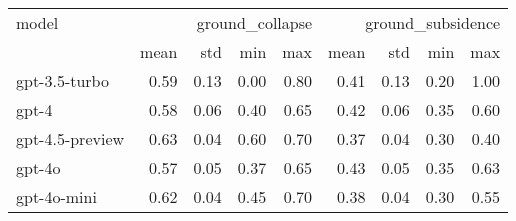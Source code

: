 \begin{tabular}{lrrrrrrrr}
\toprule
model & \multicolumn{4}{r}{ground_collapse} & \multicolumn{4}{r}{ground_subsidence} \\
 & mean & std & min & max & mean & std & min & max \\
\midrule
gpt-3.5-turbo & 0.59 & 0.13 & 0.00 & 0.80 & 0.41 & 0.13 & 0.20 & 1.00 \\
gpt-4 & 0.58 & 0.06 & 0.40 & 0.65 & 0.42 & 0.06 & 0.35 & 0.60 \\
gpt-4.5-preview & 0.63 & 0.04 & 0.60 & 0.70 & 0.37 & 0.04 & 0.30 & 0.40 \\
gpt-4o & 0.57 & 0.05 & 0.37 & 0.65 & 0.43 & 0.05 & 0.35 & 0.63 \\
gpt-4o-mini & 0.62 & 0.04 & 0.45 & 0.70 & 0.38 & 0.04 & 0.30 & 0.55 \\
\bottomrule
\end{tabular}
